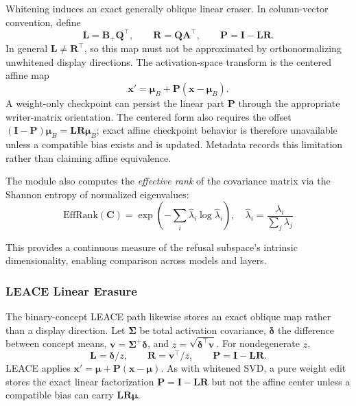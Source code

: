 \documentclass[11pt]{article}
\begin{document}
Whitening induces an exact generally oblique linear eraser. In column-vector convention, define
\begin{equation}
    \mathbf{L}=\mathbf{B}_{+}\mathbf{Q}^\top, \qquad
    \mathbf{R}=\mathbf{Q}\mathbf{A}^\top, \qquad
    \mathbf{P}=\mathbf{I}-\mathbf{L}\mathbf{R}.
    \label{eq:whitened_oblique}
\end{equation}
In general $\mathbf{L}\neq\mathbf{R}^\top$, so this map must not be approximated by orthonormalizing unwhitened display directions. The activation-space transform is the centered affine map
\begin{equation}
    \mathbf{x}'=\boldsymbol{\mu}_B+\mathbf{P}(\mathbf{x}-\boldsymbol{\mu}_B).
\end{equation}
A weight-only checkpoint can persist the linear part $\mathbf{P}$ through the appropriate writer-matrix orientation. The centered form also requires the offset $(\mathbf{I}-\mathbf{P})\boldsymbol{\mu}_B=\mathbf{L}\mathbf{R}\boldsymbol{\mu}_B$; exact affine checkpoint behavior is therefore unavailable unless a compatible bias exists and is updated. Metadata records this limitation rather than claiming affine equivalence.

The module also computes the \emph{effective rank} of the covariance matrix via the Shannon entropy of normalized eigenvalues:
\begin{equation}
    \text{EffRank}(\mathbf{C}) = \exp\left(-\sum_i \hat{\lambda}_i \log \hat{\lambda}_i\right), \quad \hat{\lambda}_i = \frac{\lambda_i}{\sum_j \lambda_j}
    \label{eq:effrank}
\end{equation}

This provides a continuous measure of the refusal subspace's intrinsic dimensionality, enabling comparison across models and layers.

\subsubsection{LEACE Linear Erasure}

The binary-concept LEACE path likewise stores an exact oblique map rather than a display direction. Let $\boldsymbol{\Sigma}$ be total activation covariance, $\boldsymbol{\delta}$ the difference between concept means, $\mathbf{v}=\boldsymbol{\Sigma}^{+}\boldsymbol{\delta}$, and $z=\sqrt{\boldsymbol{\delta}^{\top}\mathbf{v}}$. For nondegenerate $z$,
\begin{equation}
    \mathbf{L}=\boldsymbol{\delta}/z, \qquad
    \mathbf{R}=\mathbf{v}^{\top}/z, \qquad
    \mathbf{P}=\mathbf{I}-\mathbf{L}\mathbf{R}.
    \label{eq:leace_oblique}
\end{equation}
LEACE applies $\mathbf{x}'=\boldsymbol{\mu}+\mathbf{P}(\mathbf{x}-\boldsymbol{\mu})$. As with whitened SVD, a pure weight edit stores the exact linear factorization $\mathbf{P}=\mathbf{I}-\mathbf{L}\mathbf{R}$ but not the affine center unless a compatible bias can carry $\mathbf{L}\mathbf{R}\boldsymbol{\mu}$.
\end{document}
